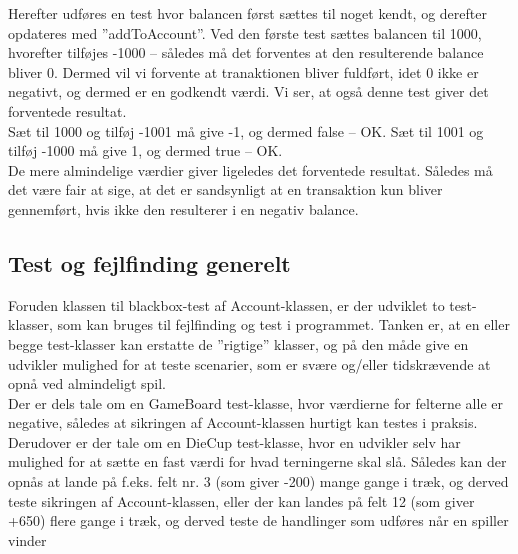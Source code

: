 Herefter udføres en test hvor balancen først sættes til noget kendt, og derefter opdateres med ”addToAccount”. Ved den første test sættes balancen til 1000, hvorefter tilføjes -1000 – således må det forventes at den resulterende balance bliver 0. Dermed vil vi forvente at tranaktionen bliver fuldført, idet 0 ikke er negativt, og dermed er en godkendt værdi. Vi ser, at også denne test giver det forventede resultat.
\\

Sæt til 1000 og tilføj -1001 må give -1, og dermed false – OK.
Sæt til 1001 og tilføj -1000 må give 1, og dermed true – OK.
\\

De mere almindelige værdier giver ligeledes det forventede resultat. Således må det være fair at sige, at det er sandsynligt at en transaktion kun bliver gennemført, hvis ikke den resulterer i en negativ balance.
\\

\subsection{Test og fejlfinding generelt}
Foruden klassen til blackbox-test af Account-klassen, er der udviklet to test-klasser, som kan bruges til fejlfinding og test i programmet. Tanken er, at en eller begge test-klasser kan erstatte de ”rigtige” klasser, og på den måde give en udvikler mulighed for at teste scenarier, som er svære og/eller tidskrævende at opnå ved almindeligt spil.
\\

Der er dels tale om en GameBoard test-klasse, hvor værdierne for felterne alle er negative, således at sikringen af Account-klassen hurtigt kan testes i praksis. Derudover er der tale om en DieCup test-klasse, hvor en udvikler selv har mulighed for at sætte en fast værdi for hvad terningerne skal slå. Således kan der opnås at lande på f.eks. felt nr. 3 (som giver -200) mange gange i træk, og derved teste sikringen af Account-klassen, eller der kan landes på felt 12 (som giver +650) flere gange i træk, og derved teste de handlinger som udføres når en spiller vinder
